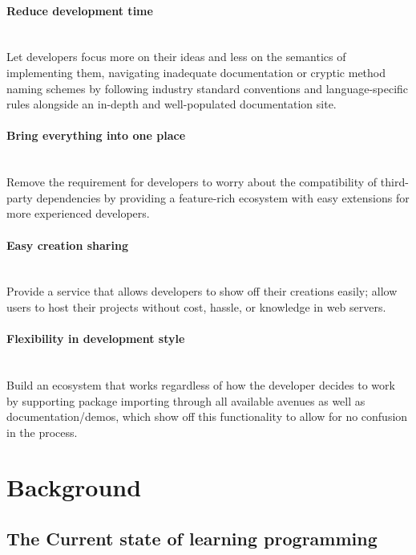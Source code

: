 \documentclass{l4proj}
\begin{document}
\subsubsection{Reduce development time} \hfill\\
\text Let developers focus more on their ideas and less on the semantics of implementing them, navigating inadequate documentation or cryptic method naming schemes by following industry standard conventions and language-specific rules alongside an in-depth and well-populated documentation site.
\\
\subsubsection{Bring everything into one place} \hfill\\
\text Remove the requirement for developers to worry about the compatibility of third-party dependencies by providing a feature-rich ecosystem with easy extensions for more experienced developers.
\\
\subsubsection{Easy creation sharing}\hfill\\
\text Provide a service that allows developers to show off their creations easily; allow users to host their projects without cost, hassle, or knowledge in web servers.
\\
\subsubsection{Flexibility in development style}\hfill\\
\text Build an ecosystem that works regardless of how the developer decides to work by supporting package importing through all available avenues as well as documentation/demos, which show off this functionality to allow for no confusion in the process.


\chapter{Background}

\section{The Current state of learning programming}
\end{document}
